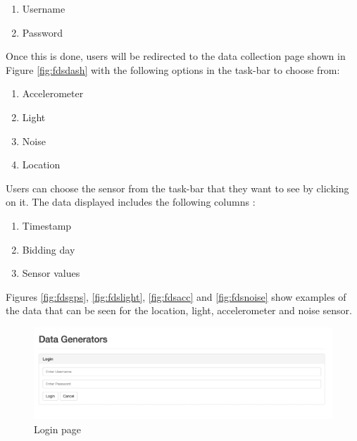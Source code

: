 \begin{enumerate}
    \item Username
    \item Password
\end{enumerate}

Once this is done, users will be redirected to the data collection page shown in Figure \ref{fig:fdsdash} with the following options in the task-bar  to choose from:

\begin{enumerate}
    \item Accelerometer
    \item Light
    \item Noise
    \item Location
\end{enumerate}

Users can choose the sensor from the task-bar that they want to see by clicking on it. The data displayed includes the following columns :

\begin{enumerate}
    \item Timestamp
    \item Bidding day
    \item Sensor values
\end{enumerate}

Figures \ref{fig:fdsgps}, \ref{fig:fdslight}, \ref{fig:fdsacc} and \ref{fig:fdsnoise} show examples of the data that can be seen for the location,
light, accelerometer and noise sensor.



  


\begin{figure}[ht!]
\centering
\includegraphics[width=\textwidth,keepaspectratio]{./images/fds_user_login1}
\caption{Login page\label{fig:fdslogin}}
\end{figure}

